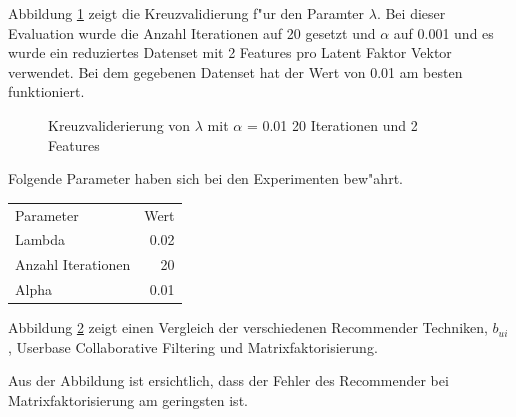 \documentclass[a4paper, 12pt]{article}
\begin{document}
Abbildung \ref{fig:lambda} zeigt die Kreuzvalidierung f"ur den Paramter $\lambda$. Bei dieser Evaluation wurde die Anzahl Iterationen auf 20 gesetzt und $\alpha$ auf 0.001 und es wurde ein reduziertes Datenset mit 2 Features pro Latent Faktor Vektor verwendet.
Bei dem gegebenen Datenset hat der Wert von 0.01 am besten funktioniert.

\begin{figure}
  \centering
{}
\label{fig:lambda}
\caption{Kreuzvaliderierung von $\lambda$ mit $\alpha$ = 0.01 20 Iterationen und 2 Features}
\end{figure}

Folgende Parameter haben sich bei den Experimenten bew"ahrt.

\begin{center}
\begin{tabular}{lr}
 Parameter           &  Wert  \\
 Lambda              &  0.02  \\
 Anzahl Iterationen  &    20  \\
 Alpha               &  0.01  \\
\end{tabular}
\end{center}

Abbildung \ref{fig:compare} zeigt einen Vergleich der verschiedenen Recommender Techniken, $b_{ui}$, Userbase Collaborative Filtering und Matrixfaktorisierung.

\begin{figure}
\centering
\label{fig:compare}
\caption{}
\end{figure}

Aus der Abbildung ist ersichtlich, dass der Fehler des Recommender bei Matrixfaktorisierung am geringsten ist.
\end{document}
